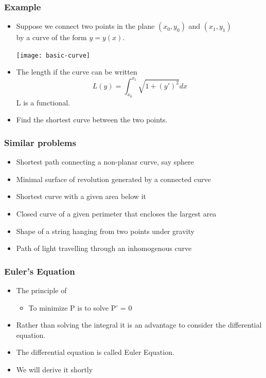 \documentclass[10pt]{beamer}
\begin{document}
\begin{frame}
  \frametitle{Example}
  \begin{itemize}
  \item Suppose we connect two points in the plane $(x_0, y_0)$ and
    $(x_1, y_1)$ \\by a curve of the form $y = y(x)$.

    \centerline{\texttt{[image: basic-curve]}}

  \item The length if the curve can be written
    \[ L(y) = \int_{x_0}^{x_1} \sqrt{1 + {(y')}^2} dx \]
    L is a functional. 
  \item Find the shortest curve between the two points. 
  \end{itemize}
\end{frame}

\begin{frame}
  \frametitle{Similar problems}
  \begin{itemize}
  \item Shortest path connecting a non-planar curve, say sphere
  \item Minimal surface of revolution generated by a connected curve
  \item Shortest curve with a given area below it
  \item Closed curve of a given perimeter that encloses the largest area
  \item Shape of a string hanging from two points under gravity
  \item Path of light travelling through an inhomogenous curve
  \end{itemize}
\end{frame}


\begin{frame}
  \frametitle{Euler's Equation}
  \begin{itemize}
  \item The principle of 
    \begin{itemize}
    \item To minimize P is to solve P' = 0
    \end{itemize}
  \item Rather than solving the integral it is an advantage to
    consider the differential equation. 
  \item The differential equation is called Euler Equation. 
  \item We will derive it shortly
  \end{itemize}
\end{frame}
\end{document}

